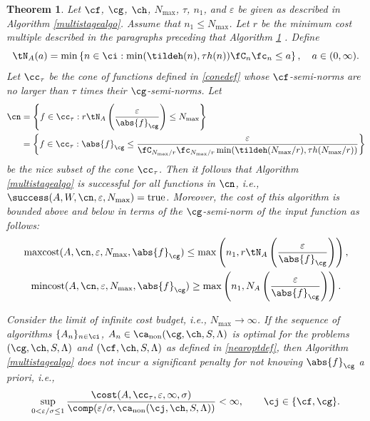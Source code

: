 \documentclass[]{elsarticle}
\DeclareMathOperator{\fix}{non}
\DeclareMathOperator{\maxcost}{maxcost}
\DeclareMathOperator{\mincost}{mincost}
\newtheorem{theorem}{Theorem}
\theoremstyle{definition}
\theoremstyle{remark}
\newcommand{\Gnorm}[1]{\abs{#1}_{\cg}}
\begin{document}
\begin{theorem}  \label{MultiStageThm}  Let  $\cf$, $\cg$, $\ch$, $N_{\max}$, $\tau$, $n_1$, and $\varepsilon$ be given as described in Algorithm \ref{multistagealgo}. Assume that $n_1 \le N_{\max}$. Let $r$ be the minimum cost multiple described in the paragraphs preceding that Algorithm \ref{MultiStageThm} .  Define 
\begin{equation} \label{tNmindef}
\tN_A(a) = \min\left\{ n \in \ci : \min(\tildeh(n),\tau h(n))\fC_n\fc_n \le a \right\}, \quad a \in (0,\infty).
\end{equation}
Let $\cc_\tau$ be the cone of functions defined in \eqref{conedef} whose $\cf$-semi-norms are no larger than $\tau$ times their $\cg$-semi-norms.  Let
\begin{align} 
\nonumber
\cn &= \left \{ f \in \cc_\tau :r\tN_{A}\left(\frac{\varepsilon}{\Gnorm{f}} \right) \le N_{\max} \right\} \\
\label{nicefdefmulti}
&= \left \{ f \in \cc_\tau : \Gnorm{f} \le \frac{\varepsilon}{\fC_{N_{\max}/r} \fc_{N_{\max}/r} \min(\tildeh(N_{\max}/r),\tau h(N_{\max}/r))} \right\}
\end{align}
be the nice subset of the cone $\cc_\tau$.  Then it follows that Algorithm \ref{multistagealgo} is successful for all functions in $\cn$,  i.e.,  $\success(A,W,\cn,\varepsilon,N_{\max}) = \text{true}$.  Moreover, the cost of this algorithm is bounded above and below in terms of the $\cg$-semi-norm of the input function as follows:
\begin{subequations} \label{automultistagedetcost}
\begin{gather}
\maxcost(A,\cn,\varepsilon,N_{\max},\Gnorm{f})
\le \max \left(n_1, r\tN_{A}\left(\frac{\varepsilon}{\Gnorm{f}} \right) \right), \\
\mincost(A,\cn,\varepsilon,N_{\max},\Gnorm{f})
\ge \max \left(n_1, N_{A}\left(\frac{\varepsilon}{\Gnorm{f}} \right) \right).
\end{gather}
\end{subequations} 

Consider the limit of infinite cost budget, i.e., $N_{\max} \to \infty$.  If the sequence of algorithms $\{A_n\}_{n \in \ci}$, $A_n \in\ca_{\fix}(\cg,\ch,S,\Lambda)$  is optimal for the problems $(\cg,\ch,S,\Lambda)$ and $(\cf,\ch,S,\Lambda)$ as defined in \eqref{nearoptdef}, then Algorithm \ref{multistagealgo} does not incur a significant penalty for not knowing $\Gnorm{f}$ a priori, i.e.,
\begin{equation*} \label{multistagepenalty}
\sup_{0 < \varepsilon/\sigma \le 1} \frac{\cost(A,\cc_{\tau},\varepsilon,\infty,\sigma)} {\comp(\varepsilon/\sigma,\ca_{\fix}(\cj,\ch,S,\Lambda))} <\infty, \qquad \cj \in \{\cf,\cg\}.
\end{equation*}
\end{theorem}
\end{document}
